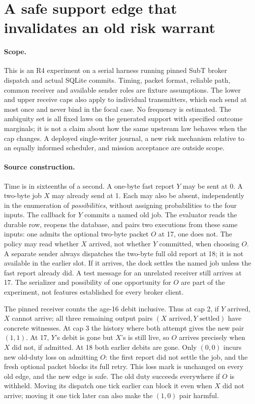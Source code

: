 \documentclass{article}
\begin{document}
\section*{A safe support edge that invalidates an old risk warrant}
\paragraph{Scope.} This is an R4 experiment on a serial harness running pinned
SubT broker dispatch and actual SQLite commits. Timing, packet format, reliable
path, common receiver and available sender roles are fixture assumptions.
The lower and upper receive caps also apply to individual transmitters, which
each send at most once and never bind in the focal case. No frequency is
estimated. The ambiguity set is all fixed laws on the generated support with
specified outcome marginals; it is not a claim about how the same upstream
law behaves when the cap changes. A deployed single-writer journal, a new
risk mechanism relative to an equally informed scheduler, and mission
acceptance are outside scope.

\paragraph{Source construction.} Time is in sixteenths of a second.
A one-byte fast report $Y$ may be sent at 0. A two-byte job $X$ may already
send at 1. Each may also be absent, independently in the enumeration of
\emph{possibilities}, without assigning probabilities to the four inputs.
The callback for $Y$ commits a named old job. The evaluator reads the durable
row, reopens the database, and pairs two executions from these same inputs:
one admits the optional two-byte packet $O$ at 17, one does not.
The policy may read whether $X$ arrived, not whether $Y$ committed, when
choosing $O$. A separate sender always dispatches the two-byte full old
report at 18; it is not available in the earlier slot. If it arrives,
the dock settles the named job unless the fast report already did.
A test message for an unrelated receiver still arrives at 17.
The serializer and possibility of one opportunity for $O$ are part of the
experiment, not features established for every broker client.

The pinned receiver counts the age-16 debit inclusive. Thus at cap 2,
if $Y$ arrived, $X$ cannot arrive; all three remaining output pairs
$(X\text{ arrived},Y\text{ settled})$ have concrete witnesses.
At cap 3 the history where both attempt gives the new pair $(1,1)$.
At 17, $Y$'s debit is gone but $X$'s is still live, so $O$ arrives precisely
when $X$ did not, if admitted. At 18 both earlier debits are gone.
Only $(0,0)$ incurs new old-duty loss on admitting $O$: the first report
did not settle the job, and the fresh optional packet blocks its full
retry. This loss mark is unchanged on every old edge, and the new edge is
safe. The old duty succeeds everywhere if $O$ is withheld. Moving its
dispatch one tick earlier can block it even when $X$ did not arrive;
moving it one tick later can also make the $(1,0)$ pair harmful.
\end{document}

